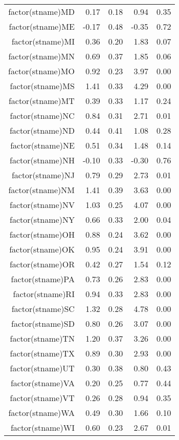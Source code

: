 \begin{table}[ht]
\begin{tabular}{rrrrr}
  factor(stname)MD & 0.17 & 0.18 & 0.94 & 0.35 \\ 
  factor(stname)ME & -0.17 & 0.48 & -0.35 & 0.72 \\ 
  factor(stname)MI & 0.36 & 0.20 & 1.83 & 0.07 \\ 
  factor(stname)MN & 0.69 & 0.37 & 1.85 & 0.06 \\ 
  factor(stname)MO & 0.92 & 0.23 & 3.97 & 0.00 \\ 
  factor(stname)MS & 1.41 & 0.33 & 4.29 & 0.00 \\ 
  factor(stname)MT & 0.39 & 0.33 & 1.17 & 0.24 \\ 
  factor(stname)NC & 0.84 & 0.31 & 2.71 & 0.01 \\ 
  factor(stname)ND & 0.44 & 0.41 & 1.08 & 0.28 \\ 
  factor(stname)NE & 0.51 & 0.34 & 1.48 & 0.14 \\ 
  factor(stname)NH & -0.10 & 0.33 & -0.30 & 0.76 \\ 
  factor(stname)NJ & 0.79 & 0.29 & 2.73 & 0.01 \\ 
  factor(stname)NM & 1.41 & 0.39 & 3.63 & 0.00 \\ 
  factor(stname)NV & 1.03 & 0.25 & 4.07 & 0.00 \\ 
  factor(stname)NY & 0.66 & 0.33 & 2.00 & 0.04 \\ 
  factor(stname)OH & 0.88 & 0.24 & 3.62 & 0.00 \\ 
  factor(stname)OK & 0.95 & 0.24 & 3.91 & 0.00 \\ 
  factor(stname)OR & 0.42 & 0.27 & 1.54 & 0.12 \\ 
  factor(stname)PA & 0.73 & 0.26 & 2.83 & 0.00 \\ 
  factor(stname)RI & 0.94 & 0.33 & 2.83 & 0.00 \\ 
  factor(stname)SC & 1.32 & 0.28 & 4.78 & 0.00 \\ 
  factor(stname)SD & 0.80 & 0.26 & 3.07 & 0.00 \\ 
  factor(stname)TN & 1.20 & 0.37 & 3.26 & 0.00 \\ 
  factor(stname)TX & 0.89 & 0.30 & 2.93 & 0.00 \\ 
  factor(stname)UT & 0.30 & 0.38 & 0.80 & 0.43 \\ 
  factor(stname)VA & 0.20 & 0.25 & 0.77 & 0.44 \\ 
  factor(stname)VT & 0.26 & 0.28 & 0.94 & 0.35 \\ 
  factor(stname)WA & 0.49 & 0.30 & 1.66 & 0.10 \\ 
  factor(stname)WI & 0.60 & 0.23 & 2.67 & 0.01 \\ 

\end{tabular}
\end{table}
